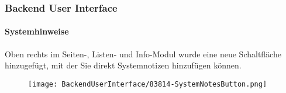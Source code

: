 %

\begin{frame}[fragile]
	\frametitle{Backend User Interface}
	\framesubtitle{Systemhinweise}

	Oben rechts im Seiten-, Listen- und Info-Modul wurde eine neue Schaltfläche hinzugefügt,
	mit der Sie direkt Systemnotizen hinzufügen können.

	\begin{figure}
		\texttt{[image: BackendUserInterface/83814-SystemNotesButton.png]}
	\end{figure}

\end{frame}

